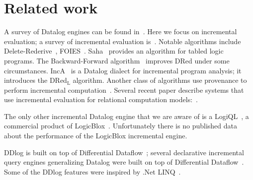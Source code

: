 \section{Related work}

A survey of Datalog engines can be found in~\cite{Maier-book18}.  Here
we focus on incremental evaluation; a survey of incremental evaluation
is~\cite{gupta-deb95}.  Notable algorithms include
Delete-Rederive~\cite{Gupta-sigmod93}, FOIES~\cite{dong-dbpl94}.
Saha~\cite{saha-iclp03} provides an algorithm for tabled logic
programs.  The Backward-Forward algorithm~\cite{motik-aaai15} improves
DRed under some circumstances.  IncA~\cite{IncA,Szabo-ase016} is a
Datalog dialect for incremental program analysis; it introduces the
DRed$_{\mbox{L}}$ algorithm.  Another class of algorithms use
provenance to perform incremental computation~\cite{liu-icde09}.
Several recent paper describe systems that use incremental evaluation
for relational computation models:~\cite{ahmad-vldb12,zhao-icmd17}.

The only other incremental Datalog engine that we are aware
of is a LogiQL~\cite{Green-pods15}, a commercial product of
LogicBlox~\cite{Aref-sigmod15}.  Unfortunately there is no published
data about the performance of the LogicBlox incremental engine.

DDlog is built on top of Differential
Dataflow~\cite{differential-dataflow}; several declarative incremental
query engines generalizing Datalog were built on top of
Differential Dataflow~\cite{timely-dataflow,differential-dataflow-paper}.  Some of the
DDlog features were inspired by .Net LINQ~\cite{meijer-dpcool03}.
